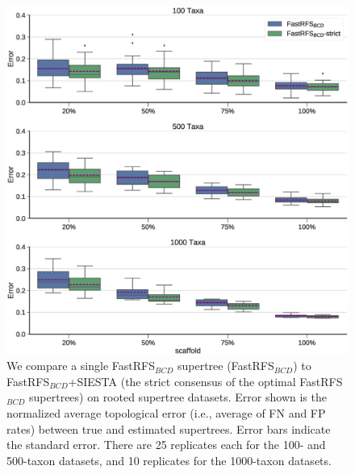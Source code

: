 \begin{figure}[ht]
  \centering
\includegraphics[width=1\textwidth]{siesta-figs/fastrfs-bcd-siesta-comparison}
\caption[Error rates for FastRFS$_{BCD}$ and FastRFS$_{BCD}$+SIESTA (strict consensus) on simulated datasets]{We compare a single FastRFS$_{BCD}$ supertree (FastRFS$_{BCD}$) to FastRFS$_{BCD}$+SIESTA (the strict consensus of the optimal FastRFS$_{BCD}$ supertrees)  on rooted supertree datasets.
Error shown is the normalized average topological error (i.e., average of FN and FP rates) between true and estimated supertrees.
Error bars indicate the standard error. 
There are 25 replicates each for the 100- and 500-taxon datasets, and 10 replicates for the 1000-taxon datasets.
  }
     \label{siesta::fig:supertree-error-rooted}
\end{figure}



